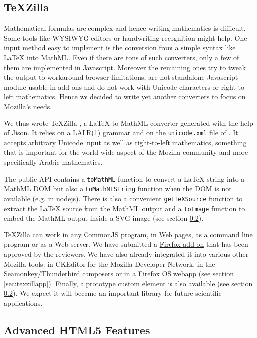 \subsection{TeXZilla}

Mathematical formulas are complex and hence writing mathematics is difficult.
Some tools like WYSIWYG editors or handwriting recognition might help. One
input method easy to implement is the conversion from a simple syntax like
LaTeX into MathML. Even if there are tons of such converters, only a few of
them are implemented in Javascript. Moreover
the remaining ones try to tweak the output
to workaround browser limitations, are not standalone Javascript module usable
in add-ons and do not work with Unicode characters or right-to-left
mathematics. Hence we decided to write yet another converters to focus on
Mozilla's needs.

We thus wrote TeXZilla \cite{TeXZilla},
a LaTeX-to-MathML converter generated with the help of
\href{http://zaach.github.io/jison/docs/}{Jison}.
It relies on a LALR(1) grammar and on the {\tt unicode.xml} file of
\cite{XMLEntityDefinition}. It accepts arbitrary
Unicode input as well as right-to-left mathematics, something that is important
for the world-wide aspect of the Mozilla community and more specifically
Arabic mathematics.

The public API contains a {\tt toMathML} function to convert a LaTeX string
into a MathML DOM but also a {\tt toMathMLString} function when the DOM is
not available (e.g. in nodejs). There is also a convenient {\tt getTeXSource}
function to extract the LaTeX source from the MathML output and a
{\tt toImage} function to embed the MathML output inside a SVG image
(see section \ref{sec:advanced}).

TeXZilla can work in any CommonJS program, in Web pages, as a command line
program or as a Web server. We have submitted a \href{https://addons.mozilla.org/en-US/firefox/addon/texzilla/}{Firefox add-on}
that has been approved by the reviewers. We have also already integrated it into
various other Mozilla tools: in CKEditor for the Mozilla Developer Network,
in the Seamonkey/Thunderbird composers or in a Firefox OS webapp
(see section \ref{sec:texzillapp}).
Finally, a prototype {\tt <x-tex>} custom element is also available
(see section \ref{sec:advanced}).
We expect it will become an important library for future scientific
applications.

\subsection{Advanced HTML5 Features}
\label{sec:advanced}

